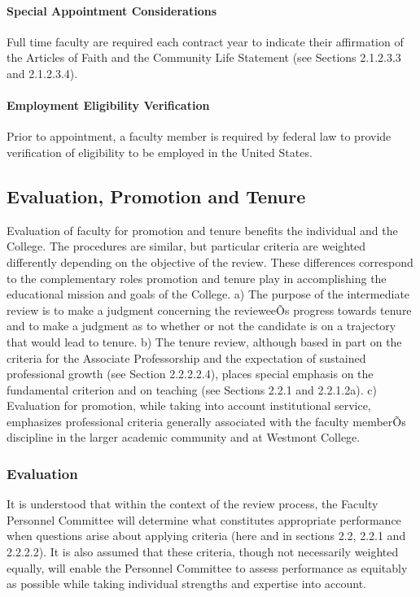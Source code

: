\documentclass[letterpaper, 11pt]{article}
\begin{document}
			\paragraph{Special Appointment Considerations}
				Full time faculty are required each contract year to indicate their affirmation of the Articles of Faith and the Community Life Statement (see Sections 2.1.2.3.3 and 2.1.2.3.4).
			\paragraph{Employment Eligibility Verification}
				Prior to appointment, a faculty member is required by federal law to provide verification of eligibility to be employed in the United States.
	\subsection{Evaluation, Promotion and Tenure}
		Evaluation of faculty for promotion and tenure benefits the individual and the College. The procedures are similar, but particular criteria are weighted differently depending on the objective of the review.  These differences correspond to the complementary roles promotion and tenure play in accomplishing the educational mission and goals of the College.
		a) The purpose of the intermediate review is to make a judgment concerning the revieweeÕs progress towards tenure and to make a judgment as to whether or not the candidate is on a trajectory that would lead to tenure.
		b) The tenure review, although based in part on the criteria for the Associate Professorship and the expectation of sustained professional growth (see Section 2.2.2.2.4), places special emphasis on the fundamental criterion and on teaching (see Sections 2.2.1 and 2.2.1.2a).
		c) Evaluation for promotion, while taking into account institutional service, emphasizes professional criteria generally associated with the faculty memberÕs discipline in the larger academic community and at Westmont College.
		\subsubsection{Evaluation}
			It is understood that within the context of the review process, the Faculty Personnel Committee will determine what constitutes appropriate performance when questions arise about applying criteria (here and in sections 2.2, 2.2.1 and 2.2.2.2).  It is also assumed that these criteria, though not necessarily weighted equally, will enable the Personnel Committee to assess performance as equitably as possible while taking individual strengths and expertise into account.
\end{document}
